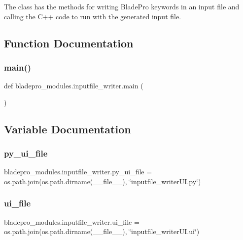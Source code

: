 The class has the methods for writing Blade\+Pro keywords in an input file and calling the C++ code to run with the generated input file. 

\subsection{Function Documentation}
\hypertarget{a00048_af7196fb030213564f7a096e5437b03c6}{}\label{a00048_af7196fb030213564f7a096e5437b03c6} 
\subsubsection{\texorpdfstring{main()}{main()}}
{\footnotesize\ttfamily def bladepro\+\_\+modules.\+inputfile\+\_\+writer.\+main (\begin{DoxyParamCaption}{ }\end{DoxyParamCaption})}



\subsection{Variable Documentation}
\hypertarget{a00048_ad7ae10efada37c5353710ada1cb4b756}{}\label{a00048_ad7ae10efada37c5353710ada1cb4b756} 
\subsubsection{\texorpdfstring{py\+\_\+ui\+\_\+file}{py\_ui\_file}}
{\footnotesize\ttfamily bladepro\+\_\+modules.\+inputfile\+\_\+writer.\+py\+\_\+ui\+\_\+file = os.\+path.\+join(os.\+path.\+dirname(\+\_\+\+\_\+file\+\_\+\+\_\+), \char`\"{}inputfile\+\_\+writer\+U\+I.\+py\char`\"{})}

\hypertarget{a00048_a1b76e57504b8ccc9af88c21882fd995f}{}\label{a00048_a1b76e57504b8ccc9af88c21882fd995f} 
\subsubsection{\texorpdfstring{ui\+\_\+file}{ui\_file}}
{\footnotesize\ttfamily bladepro\+\_\+modules.\+inputfile\+\_\+writer.\+ui\+\_\+file = os.\+path.\+join(os.\+path.\+dirname(\+\_\+\+\_\+file\+\_\+\+\_\+), \char`\"{}inputfile\+\_\+writer\+U\+I.\+ui\char`\"{})}

